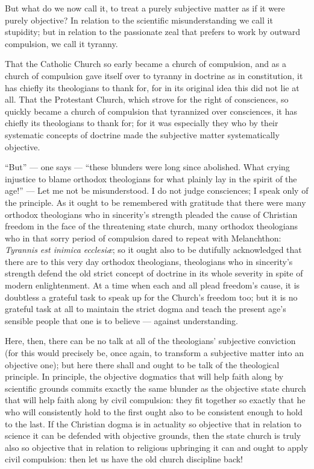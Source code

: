 \documentclass[12pt,a4paper]{book}
\begin{document}
But what do we now call it, to treat a purely subjective matter as if it were purely objective? In
relation to the scientific misunderstanding we call it stupidity; but in relation to the
passionate zeal that prefers to work by outward compulsion, we call it tyranny.

That the Catholic Church so early became a church of compulsion, and as a church of compulsion
gave itself over to tyranny in doctrine as in constitution, it has chiefly its theologians to
thank for, for in its original idea this did not lie at all. That the Protestant Church, which
strove for the right of consciences, so quickly became a church of compulsion that tyrannized
over consciences, it has
chiefly its theologians to thank for; for it was especially they who by their systematic concepts
of doctrine made the subjective matter systematically objective.

``But'' --- one says --- ``these blunders were long since abolished. What crying injustice to
blame orthodox theologians for what plainly lay in the spirit of the age!'' --- Let me not be
misunderstood. I do not judge consciences; I speak only of the principle. As it ought to be
remembered with gratitude that there were many orthodox theologians who in sincerity's strength
pleaded the cause of Christian freedom in the face of the threatening state church, many orthodox
theologians who in that sorry period of compulsion dared to repeat with Melanchthon:
\textit{Tyrannis est inimica ecclesiæ}; so it ought also to be dutifully acknowledged that there
are to this very day orthodox theologians, theologians who in sincerity's strength defend the old
strict concept of doctrine in its whole severity in spite of modern enlightenment. At a time when
each and all plead freedom's cause, it is doubtless a grateful task to speak up for the Church's
freedom too; but it is no grateful task at all to maintain the strict dogma and teach the
present age's sensible people that one is to believe --- against understanding.

Here, then, there can be no talk at all of the theologians' subjective conviction (for this would
precisely be, once again, to transform a subjective matter into an objective one); but here there
shall and ought to be talk of the theological principle. In principle, the objective dogmatics
that will help faith along by scientific grounds commits exactly the same blunder as the
objective state church that will help faith along by civil compulsion: they fit together so
exactly that he who will consistently hold to the first ought also to be consistent enough to
hold to the last. If the Christian dogma is in actuality so objective that in relation to science
it can be defended with objective grounds, then
the state church is truly also so objective that in relation to religious upbringing it can and
ought to apply civil compulsion: then let us have the old church discipline back!
\end{document}
